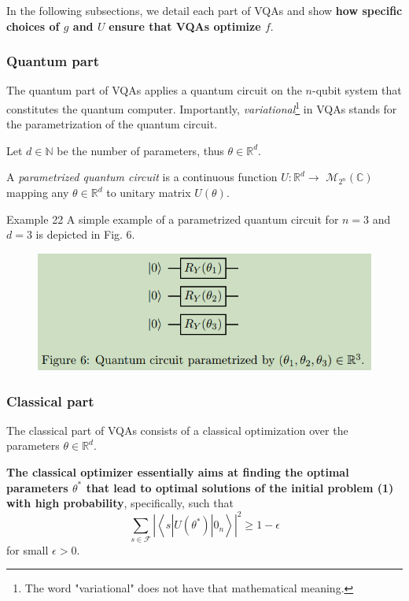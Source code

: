 In the following subsections, we detail each part of VQAs and show \textbf{how specific choices of $g$ and $U$} \textbf{ensure that VQAs optimize $f$}.

\subsubsection{Quantum part}

The quantum part of VQAs applies a quantum circuit on the $n$-qubit system that constitutes the quantum computer. Importantly, \textit{variational}\footnote{The word "variational" does not have that mathematical meaning.}  in VQAs stands for the parametrization of the quantum circuit. 

Let $d \in \mathbb{N}$ be the number of parameters, thus $\theta \in \mathbb{R}^d.$

A \textit{parametrized quantum circuit} is a continuous function $U: \mathbb{R}^{d} \rightarrow$ $\mathcal{M}_{2^{n}}(\mathbb{C})$ mapping any $\theta \in \mathbb{R}^{d}$ to unitary matrix $U(\theta)$.


Example 22 A simple example of a parametrized quantum circuit for $n=3$ and $d=3$ is depicted in Fig. 6.
\begin{figure}
    \centering
    \includegraphics[width=0.75\linewidth]{parametrized-quantum-circuit.png}
\end{figure}


\subsubsection{Classical part}

The classical part of VQAs consists of a classical optimization over the parameters $\theta \in \mathbb{R}^{d}$. 

\textbf{The classical optimizer essentially aims at finding the optimal parameters $\theta^{*}$ that lead to optimal solutions of the initial problem (1) with high probability}, specifically, such that
\begin{equation*}
\sum_{s \in \mathcal{F}}\left|\left\langle s\left|U\left(\theta^{*}\right)\right| 0_{n}\right\rangle\right|^{2} \geq 1-\epsilon \tag{10}
\end{equation*}
for small $\epsilon>0$. 

